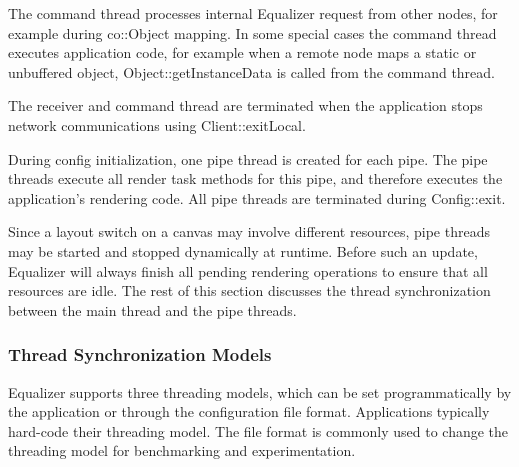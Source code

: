 \documentclass[10pt,a4]{scrartcl}
\begin{document}
The command thread processes internal Equalizer request from other
nodes, for example during \textsf{co::Object} mapping. In some
special cases the command thread executes application code, for example
when a remote node maps a static or unbuffered object,
\textsf{Object::getInstanceData} is called from the command thread.

The receiver and command thread are terminated when the application
stops network communications using \textsf{Client::exitLocal}.

During config initialization, one pipe thread is created for each pipe. The pipe
threads execute all render task methods for this pipe, and therefore executes
the application's rendering code. All pipe threads are terminated during
\textsf{Config::exit}.

Since a layout switch on a canvas may involve different resources, pipe threads
may be started and stopped dynamically at runtime. Before such an update,
Equalizer will always finish all pending rendering operations to ensure that all
resources are idle. The rest of this section discusses the thread
synchronization between the main thread and the pipe threads.


\subsubsection{\label{sThreadModel}Thread Synchronization Models}
Equalizer supports three threading models, which can be set
programmatically by the application or through the configuration file
format. Applications typically hard-code their threading model. The file
format is commonly used to change the threading model for benchmarking
and experimentation.
\end{document}
